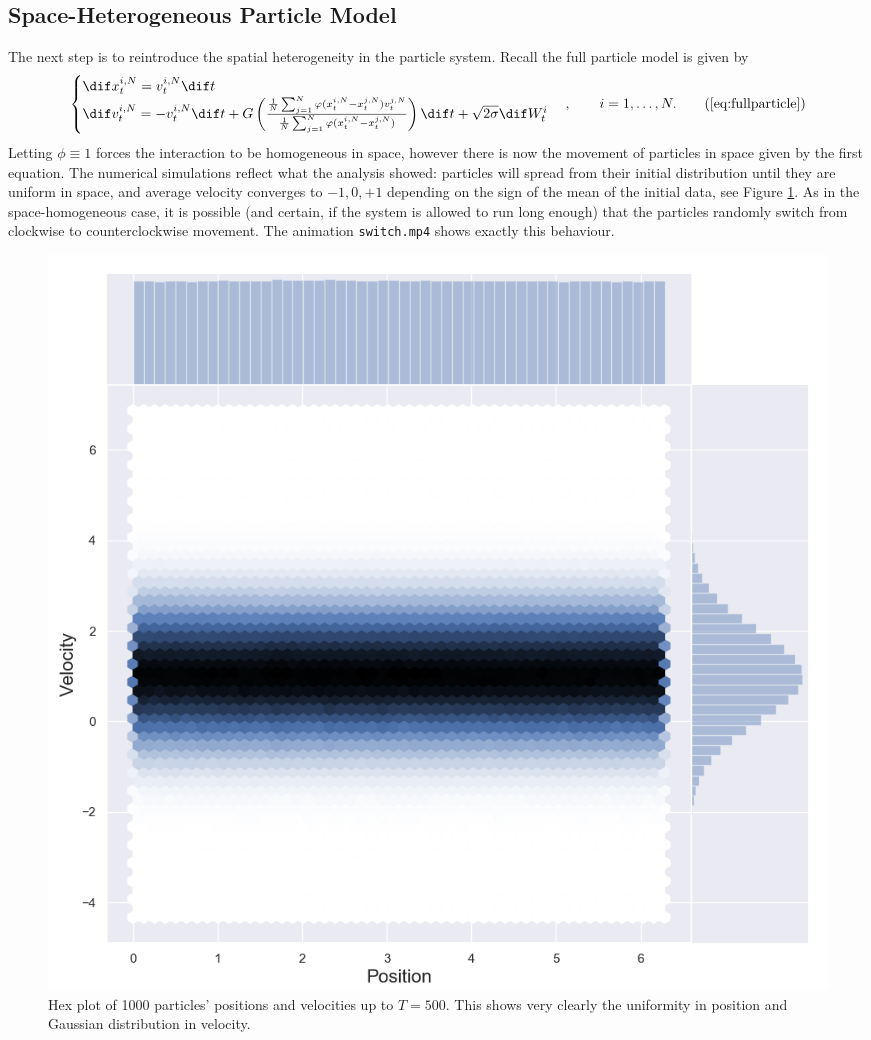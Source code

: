 \subsection{Space-Heterogeneous Particle Model}\label{sec:hetkin}
    The next step is to reintroduce the spatial heterogeneity in the particle system. Recall the full particle model is given by
            \begin{equation}\begin{cases}
    \dif x^{i,N}_t = v^{i,N}_t\dif t\\
    \dif v^{i,N}_t = -v^{i,N}_t\dif t + G\left(\frac{\frac{1}{N}\sum_{j=1}^N \phi(x_t^{i,N} - x_t^{j,N})v^{j,N}_t  }{\frac{1}{N}\sum_{j=1}^N \phi(x_t^{i,N} - x_t^{j,N})}\right)\dif t + \sqrt{2\sigma} \dif W^i_t 
    \end{cases}, \qquad  i = 1,\dots,N.\tag{\ref{eq:fullparticle}}
    \end{equation} 
    Letting $\phi\equiv 1$ forces the interaction to be homogeneous in space, however there is now the movement of particles in space given by the first equation. The numerical simulations reflect what the analysis showed: particles will spread from their initial distribution until they are uniform in space, and average velocity converges to $-1, 0, +1$ depending on the sign of the mean of the initial data, see Figure \ref{fig:hetjointplot}. As in the space-homogeneous case, it is possible (and certain, if the system is allowed to run long enough) that the particles randomly switch from clockwise to counterclockwise movement. The animation \texttt{switch.mp4} shows exactly this behaviour.
    \begin{figure}
        \centering
        \includegraphics[width=0.7\linewidth]{Figures/hetjointplot}
        \caption[Joint Plot showing marginals of space-heterogeneous particle model]{Hex plot of 1000 particles' positions and velocities up to $T=500$. This shows very clearly the uniformity in position and Gaussian distribution in velocity.}
        \label{fig:hetjointplot}
    \end{figure}

